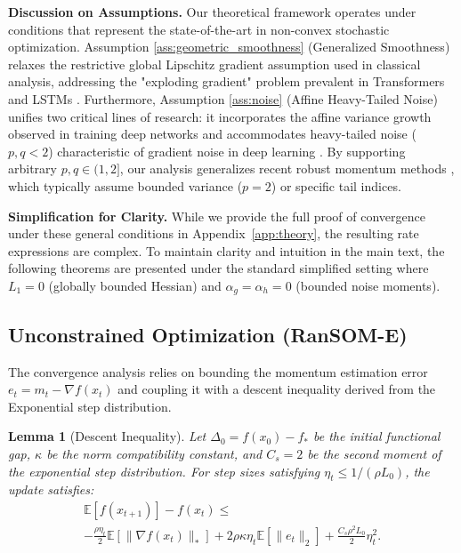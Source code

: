 \documentclass{article}
\theoremstyle{plain}
\newtheorem{lemma}[theorem]{Lemma}
\theoremstyle{definition}
\theoremstyle{remark}
\begin{document}
\textbf{Discussion on Assumptions.}
Our theoretical framework operates under conditions that represent the state-of-the-art in non-convex stochastic optimization.
Assumption \ref{ass:geometric_smoothness} (Generalized Smoothness) relaxes the restrictive global Lipschitz gradient assumption used in classical analysis, addressing the "exploding gradient" problem prevalent in Transformers and LSTMs \cite{zhang2020adaptive}.
Furthermore, Assumption \ref{ass:noise} (Affine Heavy-Tailed Noise) unifies two critical lines of research: it incorporates the affine variance growth observed in training deep networks \cite{bottou2018optimization} and accommodates heavy-tailed noise ($p, q < 2$) characteristic of gradient noise in deep learning \cite{simsekli2019tail}. By supporting arbitrary $p, q \in (1, 2]$, our analysis generalizes recent robust momentum methods \cite{cutkosky2019storm, gorbunov2020stochastic}, which typically assume bounded variance ($p=2$) or specific tail indices.

\textbf{Simplification for Clarity.} While we provide the full proof of convergence under these general conditions in Appendix~\ref{app:theory}, the resulting rate expressions are complex. To maintain clarity and intuition in the main text, the following theorems are presented under the standard simplified setting where $L_1=0$ (globally bounded Hessian) and $\alpha_g = \alpha_h = 0$ (bounded noise moments).
\subsection{Unconstrained Optimization (RanSOM-E)}

The convergence analysis relies on bounding the momentum estimation error $e_t = m_t - \nabla f(x_t)$ and coupling it with a descent inequality derived from the Exponential step distribution.

\begin{lemma}[Descent Inequality]
\label{lemma:main_descent}
Let $\Delta_0 = f(x_0) - f_*$ be the initial functional gap, $\kappa$ be the norm compatibility constant, and $C_s = 2$ be the second moment of the exponential step distribution. For step sizes satisfying $\eta_t \le 1/(\rho L_0)$, the update satisfies:
\begin{multline}
    \mathbb{E}[f(x_{t+1})] - f(x_t) \le \\-\frac{\rho \eta_t}{2} \mathbb{E}[\|\nabla f(x_t)\|_*] + 2\rho \kappa \eta_t \mathbb{E}[\|e_t\|_2] + \frac{C_s \rho^2 L_0}{2} \eta_t^2.
\end{multline}
\end{lemma}
\end{document}

